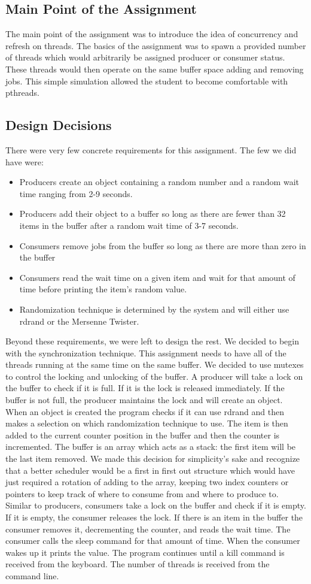 \documentclass[letterpaper,10pt,serif,draftclsnofoot,onecolumn,compsoc,titlepage]{article}%
\begin{document}
\subsection{Main Point of the Assignment}
The main point of the assignment was to introduce the idea of
concurrency and refresh on threads. The basics of the assignment was
to spawn a provided number of threads which would arbitrarily be assigned
 producer or consumer status. These threads would then operate on the same
 buffer space adding and removing jobs. This simple simulation allowed
 the student to become comfortable with pthreads.
\subsection{Design Decisions}
There were very few concrete requirements for this assignment. The few we
did have were:
\begin{itemize}
\item Producers create an object containing a random number and a random
wait time ranging from 2-9 seconds.
\item Producers add their object to a buffer so long as there are fewer
than 32 items in the buffer after a random wait time of 3-7 seconds.
\item Consumers remove jobs from the buffer so long as there are more than
zero in the buffer
\item Consumers read the wait time on a given item and wait for that amount
of time before printing the item's random value.
\item Randomization technique is determined by the system and will either
use rdrand or the Mersenne Twister.
\end{itemize}
Beyond these requirements, we were left to design the rest. We decided to
begin with the synchronization technique. This assignment needs to have
all of the threads running at the same time on the same buffer. We decided
to use mutexes to control the locking and unlocking of the buffer. A
producer will take a lock on the buffer to check if it is full. If it is
the lock is released immediately. If the buffer is not full, the producer
maintains the lock and will create an object. When an object is created
the program checks if it can use rdrand and then makes a selection on
which randomization technique to use. The item is then added to the current
counter position in the buffer and then the counter is incremented. The
buffer is an array which acts as a stack: the first item will be the last
item removed. We made this decision for simplicity's sake and recognize
that a better scheduler would be a first in first out structure which
would have just required a rotation of adding to the array, keeping two
index counters or pointers to keep track of where to consume from and
where to produce to. Similar to producers, consumers take a lock on the
buffer and check if it is empty. If it is empty, the consumer releases the
lock. If there is an item in the buffer the consumer removes it,
decrementing the counter, and reads the wait time. The consumer calls the
sleep command for that amount of time. When the consumer wakes up it prints
the value. The program continues until a kill command is received from the
keyboard. The number of threads is received from the command line.
\end{document}
